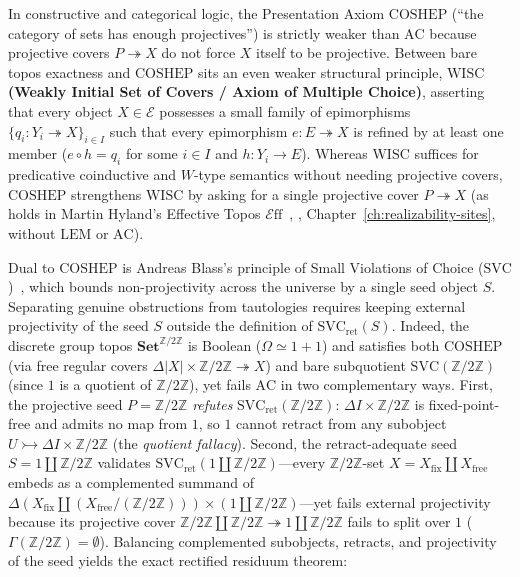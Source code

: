 \documentclass[10pt,twoside,openright]{book}
\theoremstyle{crmplain}
\theoremstyle{crmdef}
\theoremstyle{crmremark}
\newcommand{\Eff}{\mathcal{E}\mathrm{ff}}
\begin{document}
In constructive and categorical logic, the Presentation Axiom $\mathrm{COSHEP}$ (``the category of sets has enough projectives'') is strictly weaker than $\mathrm{AC}$ because projective covers $P \twoheadrightarrow X$ do not force $X$ itself to be projective. Between bare topos exactness and $\mathrm{COSHEP}$ sits an even weaker structural principle, \textbf{$\mathrm{WISC}$ (Weakly Initial Set of Covers / Axiom of Multiple Choice)}, asserting that every object $X \in \mathcal{E}$ possesses a small family of epimorphisms $\{q_i : Y_i \twoheadrightarrow X\}_{i \in I}$ such that every epimorphism $e : E \twoheadrightarrow X$ is refined by at least one member ($e \circ h = q_i$ for some $i \in I$ and $h : Y_i \to E$). Whereas $\mathrm{WISC}$ suffices for predicative coinductive and $W$-type semantics without needing projective covers, $\mathrm{COSHEP}$ strengthens $\mathrm{WISC}$ by asking for a single projective cover $P \twoheadrightarrow X$ (as holds in Martin Hyland's Effective Topos $\Eff$~\cite{Hyland82}, \cite[\S\S 3.1--3.2]{vanOosten08}, Chapter~\ref{ch:realizability-sites}, without $\mathrm{LEM}$ or $\mathrm{AC}$).

Dual to $\mathrm{COSHEP}$ is Andreas Blass's principle of Small Violations of Choice ($\mathrm{SVC}$)~\cite{Blass79}, which bounds non-projectivity across the universe by a single seed object $S$. Separating genuine obstructions from tautologies requires keeping external projectivity of the seed $S$ outside the definition of $\mathrm{SVC}_{\mathrm{ret}}(S)$. Indeed, the discrete group topos $\mathbf{Set}^{\mathbb{Z}/2\mathbb{Z}}$ is Boolean ($\Omega \simeq 1+1$) and satisfies both $\mathrm{COSHEP}$ (via free regular covers $\Delta|X| \times \mathbb{Z}/2\mathbb{Z} \twoheadrightarrow X$) and bare subquotient $\mathrm{SVC}(\mathbb{Z}/2\mathbb{Z})$ (since $1$ is a quotient of $\mathbb{Z}/2\mathbb{Z}$), yet fails $\mathrm{AC}$ in two complementary ways. First, the projective seed $P = \mathbb{Z}/2\mathbb{Z}$ \emph{refutes} $\mathrm{SVC}_{\mathrm{ret}}(\mathbb{Z}/2\mathbb{Z})$: $\Delta I \times \mathbb{Z}/2\mathbb{Z}$ is fixed-point-free and admits no map from $1$, so $1$ cannot retract from any subobject $U \rightarrowtail \Delta I \times \mathbb{Z}/2\mathbb{Z}$ (the \emph{quotient fallacy}). Second, the retract-adequate seed $S = 1 \amalg \mathbb{Z}/2\mathbb{Z}$ validates $\mathrm{SVC}_{\mathrm{ret}}(1 \amalg \mathbb{Z}/2\mathbb{Z})$---every $\mathbb{Z}/2\mathbb{Z}$-set $X = X_{\mathrm{fix}} \amalg X_{\mathrm{free}}$ embeds as a complemented summand of $\Delta(X_{\mathrm{fix}} \amalg (X_{\mathrm{free}}/\!(\mathbb{Z}/2\mathbb{Z}))) \times (1 \amalg \mathbb{Z}/2\mathbb{Z})$---yet fails external projectivity because its projective cover $\mathbb{Z}/2\mathbb{Z} \amalg \mathbb{Z}/2\mathbb{Z} \twoheadrightarrow 1 \amalg \mathbb{Z}/2\mathbb{Z}$ fails to split over $1$ ($\Gamma(\mathbb{Z}/2\mathbb{Z}) = \emptyset$). Balancing complemented subobjects, retracts, and projectivity of the seed yields the exact rectified residuum theorem:
\end{document}
